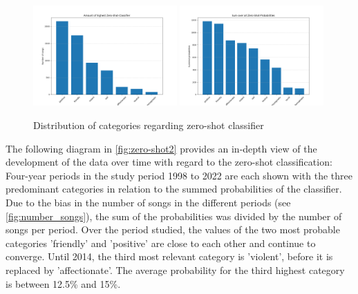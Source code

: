 \begin{figure}[!htb]
    \centering
    \includegraphics[width=0.49\textwidth]{figures/overall_score_binary_zero_shot.png}
    \includegraphics[width=0.49\textwidth]{figures/overall_score_zero_shot.png}
    \caption{Distribution of categories regarding zero-shot classifier}
    \label{fig:zero-shot}
\end{figure}

The following diagram in \autoref{fig:zero-shot2} provides an in-depth view of the development of the data over time with regard to the zero-shot classification: Four-year periods in the study period 1998 to 2022 are each shown with the three predominant categories in relation to the summed probabilities of the classifier. Due to the bias in the number of songs in the different periods (see \autoref{fig:number_songs}), the sum of the probabilities was divided by the number of songs per period. Over the period studied, the values of the two most probable categories 'friendly' and 'positive' are close to each other and continue to converge. Until 2014, the third most relevant category is 'violent', before it is replaced by 'affectionate'. The average probability for the third highest category is between 12.5\% and 15\%. 

